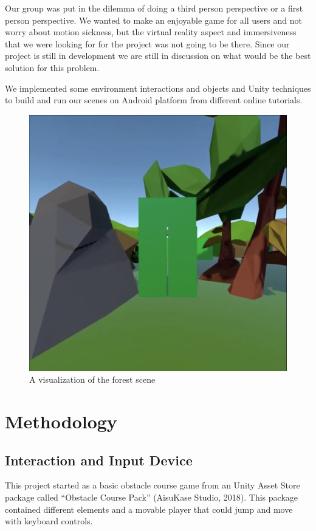 \documentclass{vgtc}                          %
\begin{document}
Our group was put in the dilemma of doing a third person perspective or a first person perspective. We wanted to make an enjoyable game for all users and not worry about motion sickness, but the virtual reality aspect and immersiveness that we were looking for for the project was not going to be there. Since our project is still in development we are still in discussion on what would be the best solution for this problem.

We implemented some environment interactions and objects and Unity techniques to build and run our scenes on Android platform from different online tutorials.~\cite{youtube_2020}

\begin{figure}[tb]
  \centering %
  \includegraphics[width=\columnwidth]{forest.png}
  \caption{A visualization of the forest scene}
 \end{figure}

\section{Methodology}
\subsection*{Interaction and Input Device}
This project started as a basic obstacle course game from an Unity Asset Store package called “Obstacle Course Pack” (AisuKase Studio, 2018). This package contained different elements and a movable player that could jump and move with keyboard controls.
\end{document}
